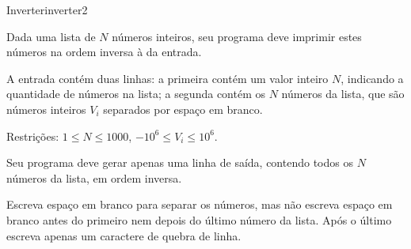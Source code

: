 \documentclass[12pt,a4paper,oneside]{article}
\begin{document}
\begin{problem}{Inverter}{inverter}{2}
 
Dada uma lista de $N$ números inteiros, seu programa deve imprimir estes números na ordem inversa à da entrada.
%

\InputFile

A entrada contém duas linhas: a primeira contém um valor inteiro $N$, indicando a quantidade de números na lista; a segunda contém os $N$ números da lista, que são números inteiros $V_i$ separados por espaço em branco.

Restrições: $1 \leq N \leq 1000$, $-10^6 \leq V_i \leq 10^6$.



\OutputFile

Seu programa deve gerar apenas uma linha de saída, contendo todos os $N$ números da lista, em ordem inversa.

\Notes
Escreva espaço em branco para separar os números, mas não escreva espaço em branco antes do primeiro nem depois do último número da lista. Após o último escreva apenas um caractere de quebra de linha.


\Example

\begin{example}
%
\end{example}

\begin{example}
%
\end{example}

\begin{example}
%
\end{example}



\end{problem}
\end{document}

